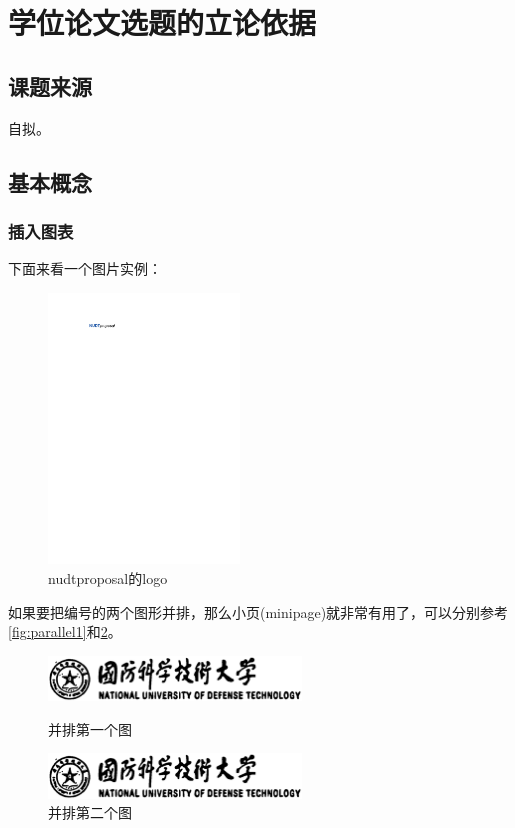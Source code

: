 \section{学位论文选题的立论依据}\label{sec:background}
\subsection{课题来源}
自拟。

\subsection{基本概念}
\subsubsection{插入图表}
下面来看一个图片实例：
\begin{figure}[htbp]
	\centering
	\includegraphics[width = 2in]{image/logo.pdf}
	\caption{nudtproposal的logo}
	\label{fig:nudt-proposal}
\end{figure}

如果要把编号的两个图形并排，那么小页(minipage)就非常有用了，可以分别参考\cref{fig:parallel1}和\cref{fig:parallel2}。
\begin{figure}[htb]
\begin{minipage}{0.48\textwidth}
  \centering
  \includegraphics[height=1.2cm]{image/xhh.eps}
  \caption{并排第一个图}
  \label{fig:parallel1}
\end{minipage}\hfill
\begin{minipage}{0.48\textwidth}
  \centering
  \includegraphics[height=1.2cm]{image/xhh.eps}
  \caption{并排第二个图}
  \label{fig:parallel2}
\end{minipage}
\end{figure}

